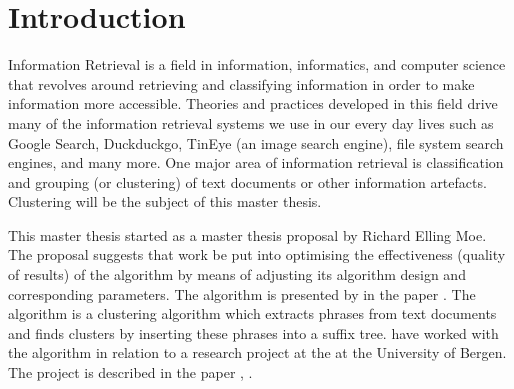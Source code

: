 
\chapter{Introduction} %

\label{Introduction}



Information Retrieval is a field in information, informatics, and computer science that revolves around retrieving and classifying information in order to make information more accessible. Theories and practices developed in this field drive many of the information retrieval systems we use in our every day lives such as Google Search, Duckduckgo, TinEye (an image search engine), file system search engines, and many more. One major area of information retrieval is classification and grouping (or clustering) of text documents or other information artefacts. Clustering will be the subject of this master thesis.

This master thesis started as a master thesis proposal by Richard Elling Moe. The proposal suggests that work be put into optimising the effectiveness (quality of results) of the \STC algorithm by means of adjusting its algorithm design and corresponding parameters. The \STC algorithm is presented by \textcite{Oren1998} in the paper . The algorithm is a clustering algorithm which extracts phrases from text documents and finds clusters by inserting these phrases into a suffix tree. \cite{Moe2014compact} have worked with the \STC algorithm in relation to a research project at the \deptname at the University of Bergen. The project is described in the paper , \cite{Elgesem2009}.

